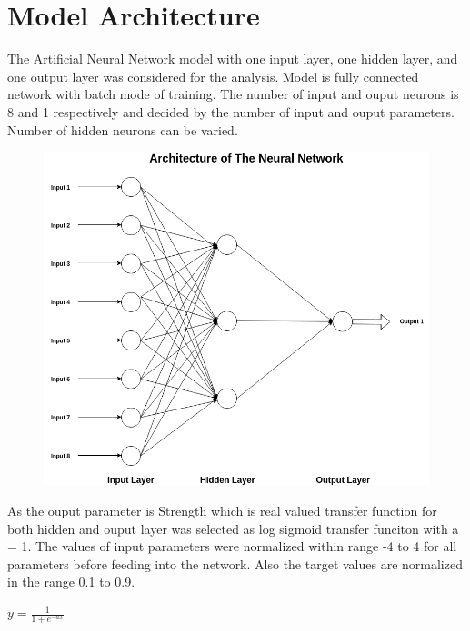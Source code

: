 \section{Model Architecture}
The Artificial Neural Network model with one input layer, one hidden layer, and one output layer was considered for the analysis. Model is fully connected network with batch mode of training. The number of input and ouput neurons is 8 and 1 respectively and decided by the number of input and ouput parameters. Number of hidden neurons can be varied.\\
\begin{figure}[h]
	\begin{center}
		\includegraphics[scale=0.5]{images/architecture.png}
	\end{center}
\end{figure}
As the ouput parameter is Strength which is real valued transfer function for both hidden and ouput layer was selected as log sigmoid transfer funciton with a = 1. The values of input parameters were normalized within range -4 to 4 for all parameters before feeding into the network. Also the target values are normalized in the range 0.1 to 0.9.
\begin{center}
		{\huge $y = \frac{1}{1 + e^{-ax}}$}
\end{center}


